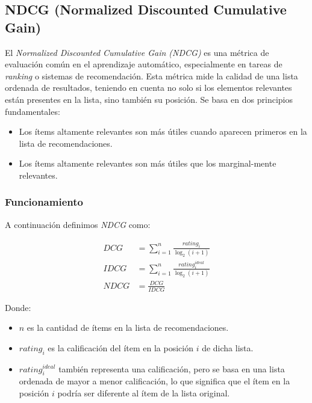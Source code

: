 \documentclass[11pt,a4paper,twoside]{thesis}
\begin{document}
\subsection{NDCG (Normalized Discounted Cumulative Gain)}


El \textit{Normalized Discounted Cumulative Gain (NDCG)} es una métrica de evaluación común en el aprendizaje automático, especialmente en tareas de \textit{ranking} o sistemas de recomendación. Esta métrica mide la calidad de una lista ordenada de resultados, teniendo en cuenta no solo si los elementos relevantes están presentes en la lista, sino también su posición. Se basa en dos principios fundamentales:

\begin{itemize}
	\item Los ítems altamente relevantes son más útiles cuando aparecen primeros en la lista de recomendaciones.
	\item Los ítems altamente relevantes son más útiles que los marginal-mente relevantes.
\end{itemize}

\subsubsection{Funcionamiento}

A continuación definimos \textit{NDCG} como:

\begin{equation}
	\begin{split}
		DCG  & = \sum_{i=1}^{n} \frac{rating_i}{\log_2(i + 1)}         \\
		IDCG & = \sum_{i=1}^{n} \frac{rating_i^{ideal}}{\log_2(i + 1)} \\
		NDCG & = \frac{DCG}{IDCG}
	\end{split}
\end{equation}

Donde:
\begin{itemize}
	\item $n$ es la cantidad de ítems en la lista de recomendaciones.
	\item $rating_i$ es la calificación del ítem en la posición $i$ de dicha lista.
	\item $rating_i^{ideal}$ también representa una calificación, pero se basa en una lista ordenada de mayor a menor calificación, lo que significa que el ítem en la posición $i$ podría ser diferente al ítem de la lista original.
\end{itemize}
\end{document}

